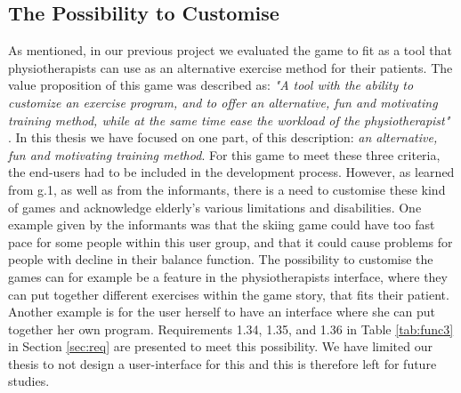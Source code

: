 \subsection{The Possibility to Customise}
As mentioned, in our previous project \cite{project} we evaluated the game to fit as a tool that physiotherapists can use as an alternative exercise method for their patients. The value proposition of this game was described as: \emph{"A tool with the ability to customize an exercise program, and to offer an alternative, fun and motivating training method, while at the same time ease the workload of the physiotherapist"} \cite{project}. In this thesis we have focused on one part, of this description: \emph{an alternative, fun and motivating training method}. For this game to meet these three criteria, the end-users had to be included in the development process. However, as learned from g.1, as well as from the informants, there is a need to customise these kind of games and acknowledge elderly's various limitations and disabilities. One example given by the informants was that the skiing game could have too fast pace for some people within this user group, and that it could cause problems for people with decline in their balance function. The possibility to customise the games can for example be a feature in the physiotherapists interface, where they can put together different exercises within the game story, that fits their patient. Another example is for the user herself to have an interface where she can put together her own program.  Requirements 1.34, 1.35, and 1.36 in Table \ref{tab:func3} in Section \ref{sec:req} are presented to meet this possibility. We have limited our thesis to not design a user-interface for this and this is therefore left for future studies. 

